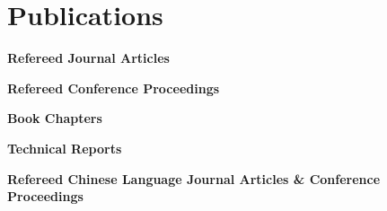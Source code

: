 \documentclass[11pt]{article}
\newenvironment{main}
{\begin{adjustwidth}{3em}{}}
{\end{adjustwidth}}
\begin{document}
\section*{Publications}
\begin{main}

\textbf{Refereed Journal Articles}
\begin{refsection}
  \nocite{
    yu2019examination,
    feng2018estimation,
    feng2018drivers,
    feng2018effects,
    feng2017can,
    feng2017computer,
    cheng2012driver,
  }
\printbibliography[heading=none]  %
\end{refsection}

\textbf{Refereed Conference Proceedings}
\begin{refsection}
  \nocite{
    feng2020naturalistic,
    bao2019examination,
    feng2018vehicle,
    jeong2017computational,
    feng2016spectral,
    chen2016development,
    feng2014computer,
    feng2013computational,
    feng2009board,
    zhang2008a,
    zhang2008b,
    lin2008analysis,
  }
\printbibliography[heading=none]  %
\end{refsection}

\textbf{Book Chapters}
\begin{refsection}
  \nocite{
    owens2019automated,
    pradhan2019training,
  }
\printbibliography[heading=none]  %
\end{refsection}

\textbf{Technical Reports}
\begin{refsection}
  \nocite{
    feng2013speech,
    chen2012survey,
  }
\printbibliography[heading=none]  %
\end{refsection}

\textbf{Refereed Chinese Language Journal Articles \& Conference Proceedings}
\begin{refsection}
  \nocite{
    zhang2010real,
    cheng2009driver,
    cheng2008real,
    feng2008rear,
    cheng2007review,
  }
\printbibliography[heading=none]  %
\end{refsection}


\end{main}
\end{document}
